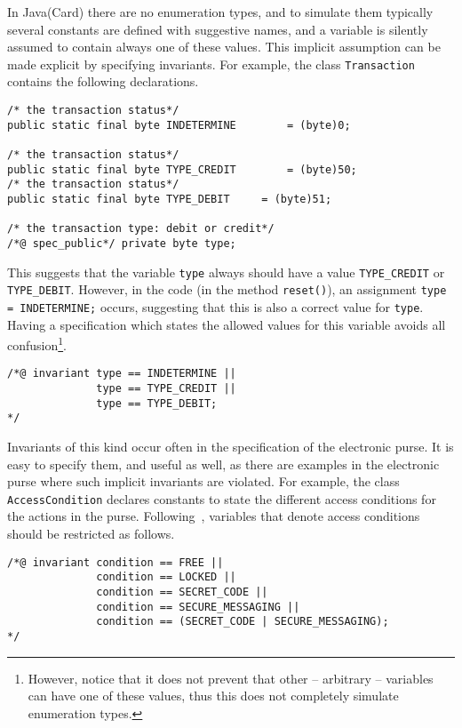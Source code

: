 \documentclass[a4paper]{llncs}
\begin{document}
In Java(Card) there are no enumeration types, and to simulate them
typically several constants are defined with suggestive names, and a
variable is silently assumed to contain always one of these
values. This implicit assumption can be made explicit by specifying
invariants. For example, the class \texttt{Transaction} contains the
following declarations.
\begin{verbatim}
/* the transaction status*/
public static final byte INDETERMINE		= (byte)0;

/* the transaction status*/
public static final byte TYPE_CREDIT		= (byte)50;
/* the transaction status*/
public static final byte TYPE_DEBIT		= (byte)51;
    
/* the transaction type: debit or credit*/
/*@ spec_public*/ private byte type;
\end{verbatim}

This suggests that the variable \texttt{type} always should have a
value \texttt{TYPE\_CREDIT} or \texttt{TYPE\_DEBIT}. However, in the
code (in the method \texttt{reset()}), an assignment \texttt{type =
INDETERMINE;} occurs, suggesting that this is also a correct value for 
\texttt{type}. Having a specification which states the allowed values
for this variable avoids all confusion\footnote{However, notice that it 
does not prevent that other -- arbitrary -- variables can have one of
these values, thus this does not completely simulate enumeration
types.}.
\begin{verbatim}
/*@ invariant type == INDETERMINE ||
              type == TYPE_CREDIT || 
              type == TYPE_DEBIT;
*/
\end{verbatim}

Invariants of this kind occur often in the specification of the
electronic purse. It is easy to specify them, and useful as well, as
there are examples in the electronic purse where such implicit
invariants are violated.
For example, the class \texttt{AccessCondition} declares constants to
state the different access conditions for the actions in the
purse. Following~\cite{BretagneMGL00}, variables that denote access conditions
should be restricted as follows.
\begin{verbatim}
/*@ invariant condition == FREE ||
              condition == LOCKED ||
              condition == SECRET_CODE ||
              condition == SECURE_MESSAGING ||
              condition == (SECRET_CODE | SECURE_MESSAGING);
*/
\end{verbatim}
\end{document}
